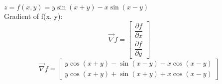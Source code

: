 $z = f(x, y) = y\sin(x+y)-x\sin(x-y)$ \\
Gradient of f(x, y):
$$\vec{\nabla} f = \begin{bmatrix}
	\dfrac{\partial f}{\partial x} \\[6pt]
	\dfrac{\partial f}{\partial y}
\end{bmatrix} $$
$$\vec{\nabla} f = \begin{bmatrix}
	y \cos(x + y) - \sin(x - y) - x  \cos(x - y) \\
	y  \cos(x + y) + \sin(x + y) + x  \cos(x - y)
\end{bmatrix} $$